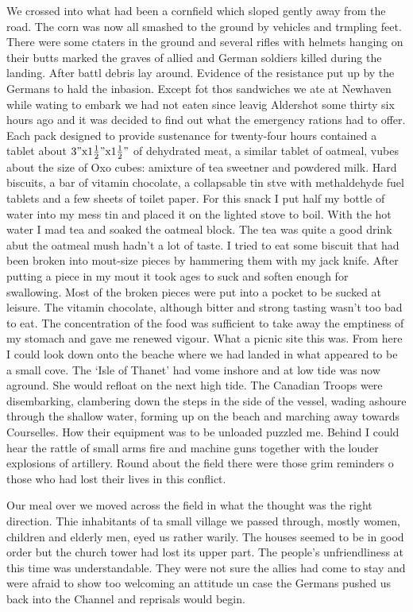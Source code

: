 We crossed into what had been a cornfield which sloped gently away
from the road. The corn was now all smashed to the ground by vehicles
and trmpling feet. There were some ctaters in the ground and several
rifles with helmets hanging on their butts marked the graves of allied
and German soldiers killed during the landing. After battl debris lay
around. Evidence of the resistance put up by the Germans to hald the
inbasion. Except fot thos sandwiches we ate at Newhaven while wating
to embark we had not eaten since leavig Aldershot some thirty six
hours ago and it was decided to find out what the emergency rations
had to offer. Each pack designed to provide sustenance for twenty-four
hours contained a tablet about $3" {\rm x} 1 \frac{1}{2}" {\rm x} 1
\frac{1}{2}"$ of dehydrated meat, a similar tablet of oatmeal, vubes
about the size of Oxo cubes: amixture of tea sweetner and powdered
milk. Hard biscuits, a bar of vitamin chocolate, a collapsable tin
stve with methaldehyde fuel tablets and a few sheets of toilet
paper. For this snack I put half my bottle of water into my mess tin
and placed it on the lighted stove to boil. With the hot water I mad
tea and soaked the oatmeal block. The tea was quite a good drink abut
the oatmeal mush hadn't a lot of taste. I tried to eat some biscuit
that had been broken into mout-size pieces by hammering them with my
jack knife. After putting a piece in my mout it took ages to suck and
soften enough for swallowing. Most of the broken pieces were put into
a pocket to be sucked at leisure. The vitamin chocolate, although
bitter and strong tasting wasn't too bad to eat. The concentration of
the food was sufficient to take away the emptiness of my stomach and
gave me renewed vigour. What a picnic site this was. From here I could
look down onto the beache where we had landed in what appeared to be a
small cove. The `Isle of Thanet' had vome inshore and at low tide was
now aground. She would refloat on the next high tide. The Canadian
Troops were disembarking, clambering down the steps in the side of the
vessel, wading ashoure through the shallow water, forming up on the
beach and marching away towards Courselles. How their equipment was to
be unloaded puzzled me. Behind I could hear the rattle of small arms
fire and machine guns together with the louder explosions of
artillery. Round about the field there were those grim reminders o
those who had lost their lives in this conflict.

Our meal over we moved across the field in what the \lieutenant thought was
the right direction. Thie inhabitants of ta small village we passed
through, mostly women, children and elderly men, eyed us rather
warily. The houses seemed to be in good order but the church tower had
lost its upper part. The people's unfriendliness at this time was
understandable. They were not sure the allies had come to stay and
were afraid to show too welcoming an attitude un case the Germans
pushed us back into the Channel and reprisals would begin.

